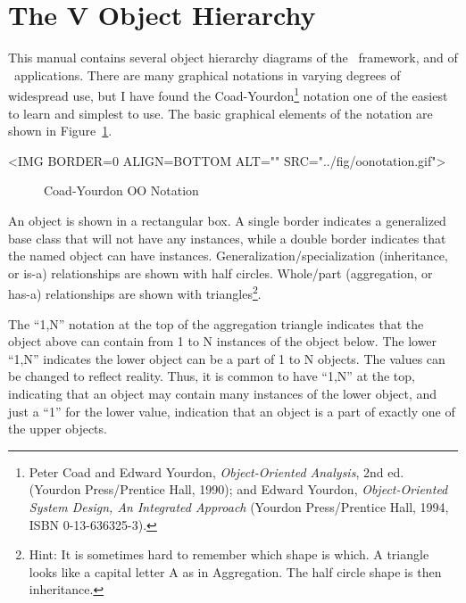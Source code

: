 \section{The V Object Hierarchy}

This manual contains several object hierarchy diagrams of the
\V\ framework, and of \V\ applications. There are many graphical
notations in varying degrees of widespread use, but I have found
the Coad-Yourdon\footnote{Peter Coad and Edward Yourdon, 
\emph{Object-Oriented Analysis}, 2nd ed. (Yourdon
Press/Prentice Hall, 1990); and Edward Yourdon, \emph{Object-Oriented
System Design, An Integrated Approach} (Yourdon Press/Prentice Hall,
1994, ISBN 0-13-636325-3).} notation one of the
easiest to learn and simplest to use. The basic graphical
elements of the notation are shown in  Figure~\ref{fig:oonotation}.

\begin{rawhtml}
<IMG BORDER=0 ALIGN=BOTTOM ALT="" SRC="../fig/oonotation.gif">
\end{rawhtml}

\begin{figure}[htb]

\begin{center}
\small
\begin{latexonly}

\end{latexonly}
\normalfont\normalsize
\end{center}

\caption{Coad-Yourdon OO Notation} \label{fig:oonotation}
\end{figure}

An object is shown in a rectangular box. A single border indicates
a generalized base class that will not have any instances,
while a double border indicates that the named object can have
instances. Generalization/specialization (inheritance, or is-a)
relationships are shown with half circles. Whole/part (aggregation,
or has-a) relationships are shown with triangles\footnote{Hint:
It is sometimes hard to remember which shape is which. A triangle
looks like a capital letter A as in Aggregation. The half circle
shape is then inheritance.}.

The ``1,N'' notation at the top of the aggregation triangle
indicates that the object above can contain from 1 to N instances
of the object below. The lower ``1,N'' indicates the lower object
can be a part of 1 to N objects. The values can be changed to
reflect reality. Thus, it is common to have ``1,N'' at the top,
indicating that an object may contain many instances of the lower
object, and just a ``1'' for the lower value, indication that an
object is a part of exactly one of the upper objects.

